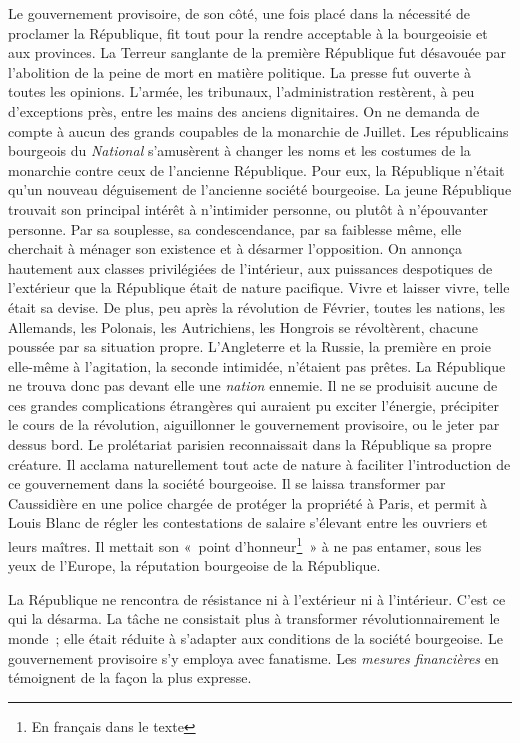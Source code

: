 \documentclass[twoside]{book} %
\begin{document}
Le gouvernement provisoire, de son côté, une fois placé dans la nécessité de proclamer la République, fit tout pour la rendre acceptable à la bourgeoisie et aux provinces. La Terreur sanglante de la première République fut désavouée par l’abolition de la peine de mort en matière politique. La presse fut ouverte à toutes les opinions. L’armée, les tribunaux, l’administration restèrent, à peu d’exceptions près, entre les mains des anciens dignitaires. On ne demanda de compte à aucun des grands coupables de la monarchie de Juillet. Les républicains bourgeois du \emph{National} s’amusèrent à changer les noms et les costumes de la monarchie contre ceux de l’ancienne République. Pour eux, la République n’était qu’un nouveau déguisement de l’ancienne société bourgeoise. La jeune République trouvait son principal intérêt à n’intimider personne, ou plutôt à n’épouvanter personne. Par sa souplesse, sa condescendance, par sa faiblesse même, elle cherchait à ménager son existence et à désarmer l’opposition. On annonça hautement aux classes privilégiées de l’intérieur, aux puissances despotiques de l’extérieur que la République était de nature pacifique. Vivre et laisser vivre, telle était sa devise. De plus, peu après la révolution de Février, toutes les nations, les Allemands, les Polonais, les Autrichiens, les Hongrois se révoltèrent, chacune poussée par sa situation propre. L’Angleterre et la Russie, la première en proie elle-même à l’agitation, la seconde intimidée, n’étaient pas prêtes. La République ne trouva donc pas devant elle une \emph{nation} ennemie. Il ne se produisit aucune de ces grandes complications étrangères qui auraient pu exciter l’énergie, précipiter le cours de la révolution, aiguillonner le gouvernement provisoire, ou le jeter par dessus bord. Le prolétariat parisien reconnaissait dans la République sa propre créature. Il acclama naturellement tout acte de nature à faciliter l’introduction de ce gouvernement dans la société bourgeoise. Il se laissa transformer par Caussidière en une police chargée de protéger la propriété à Paris, et permit à Louis Blanc de régler les contestations de salaire s’élevant entre les ouvriers et leurs maîtres. Il mettait son « point d’honneur\footnote{En français dans le texte} » à ne pas entamer, sous les yeux de l’Europe, la réputation bourgeoise de la République.\par
La République ne rencontra de résistance ni à l’extérieur ni à l’intérieur. C’est ce qui la désarma. La tâche ne consistait plus à transformer révolutionnairement le monde ; elle était réduite à s’adapter aux conditions de la société bourgeoise. Le gouvernement provisoire s’y employa avec fanatisme. Les \emph{mesures financières} en témoignent de la façon la plus expresse.\par
\end{document}
